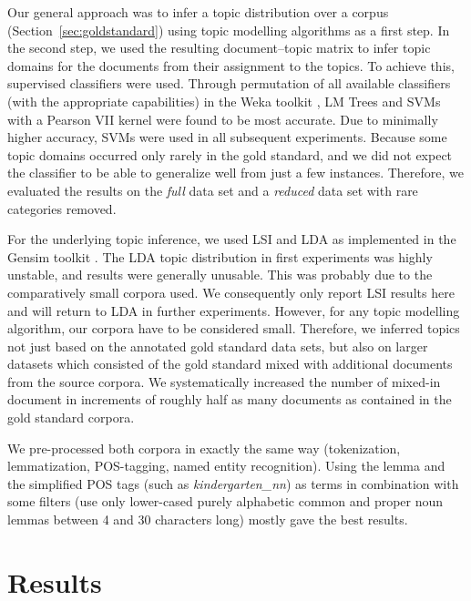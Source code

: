 \documentclass[11pt]{article}
\begin{document}
Our general approach was to infer a topic distribution over a corpus (Section~\ref{sec:goldstandard}) using topic modelling algorithms as a first step.
In the second step, we used the resulting document--topic matrix to infer topic domains for the documents from their assignment to the topics.
To achieve this, supervised classifiers were used.
Through permutation of all available classifiers (with the appropriate capabilities) in the Weka toolkit \cite{HallWitten2011}, LM Trees \cite{LandwehrEa2005} and SVMs with a Pearson VII kernel \cite{UstunEa2006} were found to be most accurate.
Due to minimally higher accuracy, SVMs were used in all subsequent experiments.
Because some topic domains occurred only rarely in the gold standard, and we did not expect the classifier to be able to generalize well from just a few instances.
Therefore, we evaluated the results on the \textit{full} data set and a \textit{reduced} data set with rare categories removed.

For the underlying topic inference, we used LSI and LDA as implemented in the Gensim toolkit \cite{RehurekSojka2010}.
The LDA topic distribution in first experiments was highly unstable, and results were generally unusable.
This was probably due to the comparatively small corpora used.
We consequently only report LSI results here and will return to LDA in further experiments.
However, for any topic modelling algorithm, our corpora have to be considered small.
Therefore, we inferred topics not just based on the annotated gold standard data sets, but also on larger datasets which consisted of the gold standard mixed with additional documents from the source corpora.
We systematically increased the number of mixed-in document in increments of roughly half as many documents as contained in the gold standard corpora.

We pre-processed both corpora in exactly the same way (tokenization, lemmatization, POS-tagging, named entity recognition).
Using the lemma and the simplified POS tags (such as \textit{kindergarten\_nn}) as terms in combination with some filters (use only lower-cased purely alphabetic common and proper noun lemmas between 4 and 30 characters long) mostly gave the best results.

\section{Results}
\label{sec:results}
\end{document}
